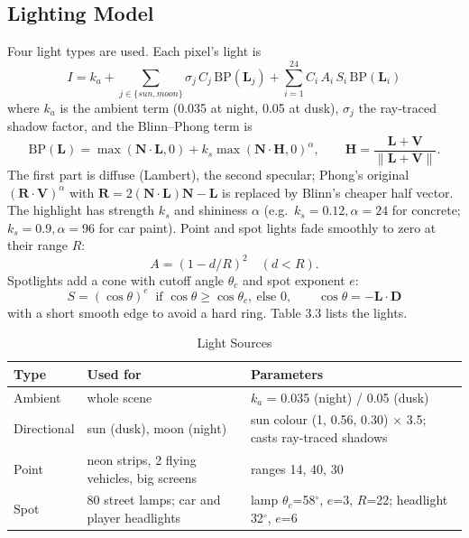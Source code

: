 \documentclass[12pt, a4paper]{report}
\begin{document}
\subsection{Lighting Model}

\begin{justify}
  {\fontsize{12}{13.8}\selectfont
    Four light types are used. Each pixel's light is
    \begin{equation}
      I = k_a + \sum_{j\in\{sun,moon\}} \sigma_j\,C_j\,\mathrm{BP}(\mathbf{L}_j) + \sum_{i=1}^{24} C_i\,A_i\,S_i\,\mathrm{BP}(\mathbf{L}_i)
    \end{equation}
    where $k_a$ is the ambient term (0.035 at night, 0.05 at dusk), $\sigma_j$ the ray-traced shadow factor, and the Blinn--Phong term is
    \begin{equation}
      \mathrm{BP}(\mathbf{L}) = \max(\mathbf{N}\cdot\mathbf{L},0) + k_s\max(\mathbf{N}\cdot\mathbf{H},0)^{\alpha},
      \qquad \mathbf{H} = \frac{\mathbf{L}+\mathbf{V}}{\lVert\mathbf{L}+\mathbf{V}\rVert}.
    \end{equation}
    The first part is diffuse (Lambert), the second specular; Phong's original $(\mathbf{R}\cdot\mathbf{V})^{\alpha}$ with $\mathbf{R}=2(\mathbf{N}\cdot\mathbf{L})\mathbf{N}-\mathbf{L}$ is replaced by Blinn's cheaper half vector. The highlight has strength $k_s$ and shininess $\alpha$ (e.g.\ $k_s=0.12,\alpha=24$ for concrete; $k_s=0.9,\alpha=96$ for car paint). Point and spot lights fade smoothly to zero at their range $R$:
    \begin{equation}
      A = \left(1 - d/R\right)^2 \quad (d<R).
    \end{equation}
    Spotlights add a cone with cutoff angle $\theta_c$ and spot exponent $e$:
    \begin{equation}
      S = (\cos\theta)^{e}\ \text{ if } \cos\theta \ge \cos\theta_c,\ \text{else } 0, \qquad \cos\theta = -\mathbf{L}\cdot\mathbf{D}
    \end{equation}
    with a short smooth edge to avoid a hard ring. Table 3.3 lists the lights.
  }
\end{justify}

\begin{table}[!htbp]
  \caption{Light Sources}
  \label{tab:3.1}
  \centering
  {\fontsize{10}{13}\selectfont
    \begin{tabular}{|p{1.0in}|p{2.1in}|p{2.3in}|}
      \hline
      \textbf{Type} & \textbf{Used for} & \textbf{Parameters} \\
      \hline
      Ambient & whole scene & $k_a$ = 0.035 (night) / 0.05 (dusk) \\
      \hline
      Directional & sun (dusk), moon (night) & sun colour (1, 0.56, 0.30) $\times$ 3.5; casts ray-traced shadows \\
      \hline
      Point & neon strips, 2 flying vehicles, big screens & ranges 14, 40, 30 \\
      \hline
      Spot & 80 street lamps; car and player headlights & lamp $\theta_c$=58$^\circ$, $e$=3, $R$=22; headlight 32$^\circ$, $e$=6 \\
      \hline
    \end{tabular}
  }
\end{table}
\end{document}
